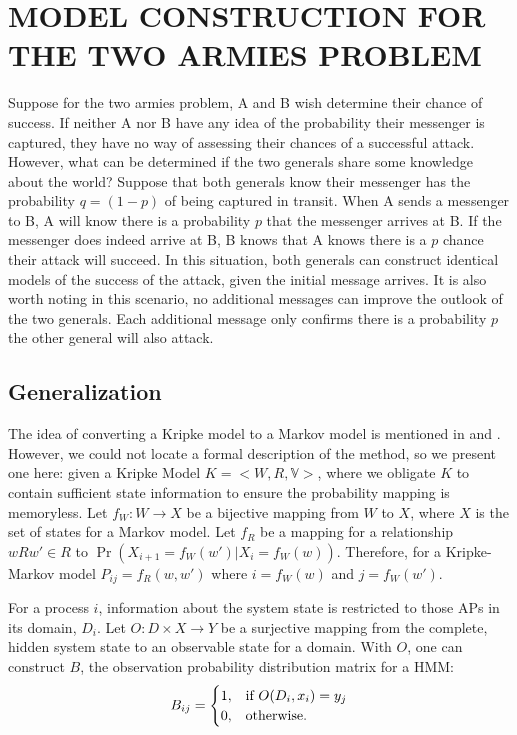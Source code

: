 \section{MODEL CONSTRUCTION FOR THE TWO ARMIES PROBLEM}
Suppose for the two armies problem, A and B wish determine their chance of success.
If neither A nor B have any idea of the probability their messenger is captured, they have no way of assessing their chances of a successful attack.
However, what can be determined if the two generals share some knowledge about the world?
Suppose that both generals know their messenger has the probability $q=(1-p)$ of being captured in transit.
When A sends a messenger to B, A will know there is a probability $p$ that the messenger arrives at B.
If the messenger does indeed arrive at B, B knows that A knows there is a $p$ chance their attack will succeed.
In this situation, both generals can construct identical models of the success of the attack, given the initial message arrives.
It is also worth noting in this scenario, no additional messages can improve the outlook of the two generals.
Each additional message only confirms there is a probability $p$ the other general will also attack.

\subsection{Generalization}

The idea of converting a Kripke model to a Markov model is mentioned in \cite{kripkemarkov1} and \cite{kripkemarkov2}.
However, we could not locate a formal description of the method, so we present one here:
given a Kripke Model $K = <W,R,\mathbb{V}>$, where we obligate $K$ to contain sufficient state information to ensure the probability mapping is memoryless.
Let $f_{W} : W \rightarrow X$ be a bijective mapping from $W$ to $X$, where $X$ is the set of states for a Markov model.
Let $f_{R}$ be a mapping for a relationship $wRw' \in R$ to $\Pr(X_{i+1}=f_W(w') | X_{i}=f_W(w))$.
Therefore, for a Kripke-Markov model $P_{ij} = f_R(w,w')$ where $i=f_W(w)$ and $j=f_W(w')$.

For a process $i$, information about the system state is restricted to those \ac{AP}s in its domain, $D_i$.
Let $O : D \times X \rightarrow Y$ be a surjective mapping from the complete, hidden system state to an observable state for a domain.
With $O$, one can construct $B$, the observation probability distribution matrix for a \ac{HMM}:
\vspace{6pt}
\begin{equation}
 B_{ij} =
   \begin{cases}
    1, & \text{if } O(D_i, x_i) = y_j\\
    0, & \text{otherwise.} \\
  \end{cases}
  \vspace{12pt}
\end{equation}

